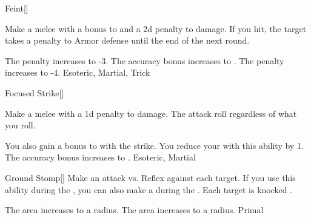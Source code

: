 \lowercase{\hypertarget{maneuver:Feint}{}}\label{maneuver:Feint}
\hypertarget{maneuver:Feint}{}
\begin{freeability}[Rank 1]{Feint}[]

Make a melee  with a  bonus to  and a \minus2d penalty to damage.
If you hit, the target takes a  penalty to Armor defense until the end of the next round.

\rankline
{} The penalty increases to -3.
 The accuracy bonus increases to .
 The penalty increases to -4.
 Esoteric, Martial, Trick
\end{freeability}
\vspace{0.25em}



\lowercase{\hypertarget{maneuver:Focused Strike}{}}\label{maneuver:Focused Strike}
\hypertarget{maneuver:Focused Strike}{}
\begin{freeability}[Rank 1]{Focused Strike}[]

Make a melee  with a \minus1d penalty to damage.
The attack roll  regardless of what you roll.

\rankline
{} You also gain a  bonus to  with the strike.
 You reduce your  with this ability by 1.
 The accuracy bonus increases to .
 Esoteric, Martial
\end{freeability}
\vspace{0.25em}



\lowercase{\hypertarget{maneuver:Ground Stomp}{}}\label{maneuver:Ground Stomp}
\hypertarget{maneuver:Ground Stomp}{}
\begin{freeability}[Rank 3]{Ground Stomp}[]
Make an attack vs. Reflex against each target.
If you use this ability during the , you can also make a  during the .
\hit Each target is knocked \prone.

\rankline
{} The area increases to a \areamed radius.
 The area increases to a \arealarge radius.
 Primal
\end{freeability}
\vspace{0.25em}



